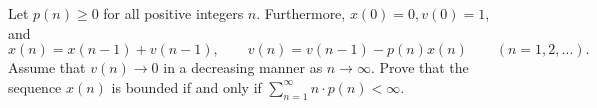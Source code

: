 Let $p(n)\geq 0$ for all positive integers $n$. Furthermore, $x(0)=0, v(0)=1$, and \[x(n)=x(n-1)+v(n-1), \qquad v(n)=v(n-1)-p(n)x(n) \qquad (n=1,2,\dots).\]Assume that $v(n)\to 0$ in a decreasing manner as $n \to \infty$. Prove that the sequence $x(n)$ is bounded if and only if $\sum_{n=1}^{\infty}n\cdot p(n)<\infty$.